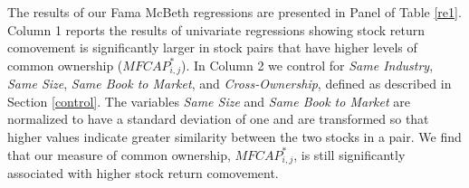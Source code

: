 	
The results of our Fama McBeth regressions are presented in Panel  of Table \ref{re1}.
Column 1 reports the results of univariate regressions showing stock return comovement is significantly larger in stock pairs that have higher levels of common ownership ($ MFCAP^*_{i,j}$). 
 In Column 2 we control for  \textit{Same Industry}, \textit{Same Size}, \textit{Same Book to Market}, and \textit{Cross-Ownership}, defined as described in Section \ref{control}. The variables \textit{Same Size} and \textit{Same Book to Market} are normalized to have a standard deviation of one and are transformed so that higher values indicate greater similarity between the two stocks in a pair. We find that our measure of common ownership, $ MFCAP^*_{i,j}$, is still significantly associated with higher stock return comovement. 
		
